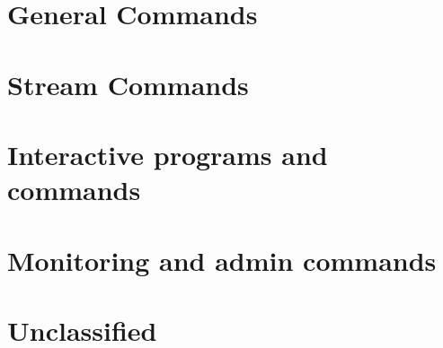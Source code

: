\section{General Commands}







\section{Stream Commands}











\section{Interactive programs and commands}







\section{Monitoring and admin commands}









\section{Unclassified}





